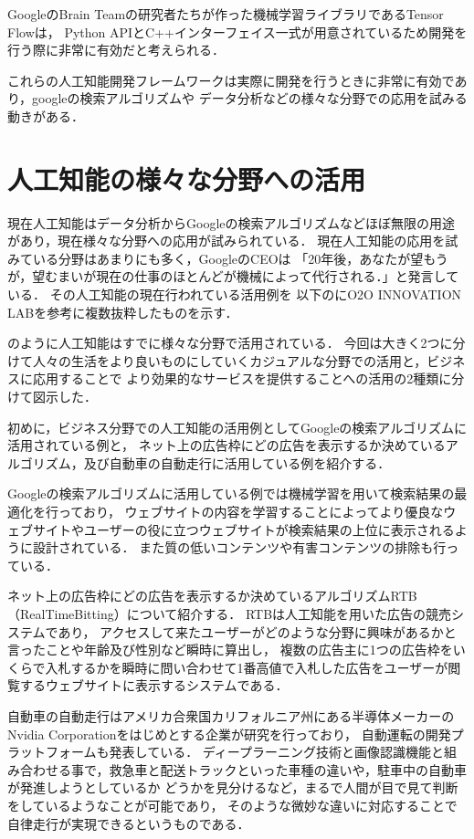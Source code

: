 GoogleのBrain Teamの研究者たちが作った機械学習ライブラリであるTensor Flowは，
Python APIとC++インターフェイス一式が用意されているため開発を行う際に非常に有効だと考えられる．

これらの人工知能開発フレームワークは実際に開発を行うときに非常に有効であり，googleの検索アルゴリズムや
データ分析などの様々な分野での応用を試みる動きがある．

\section{人工知能の様々な分野への活用}
現在人工知能はデータ分析からGoogleの検索アルゴリズムなどほぼ無限の用途があり，現在様々な分野への応用が試みられている．
現在人工知能の応用を試みている分野はあまりにも多く，GoogleのCEOは
「20年後，あなたが望もうが，望むまいが現在の仕事のほとんどが機械によって代行される．」\cite{ceo}と発言している．
その人工知能の現在行われている活用例を
以下のにO2O INNOVATION LAB\cite{lab}を参考に複数抜粋したものを示す．


のように人工知能はすでに様々な分野で活用されている．
今回は大きく2つに分けて人々の生活をより良いものにしていくカジュアルな分野での活用と，ビジネスに応用することで
より効果的なサービスを提供することへの活用の2種類に分けて図示した．

初めに，ビジネス分野での人工知能の活用例としてGoogleの検索アルゴリズムに活用されている例と，
ネット上の広告枠にどの広告を表示するか決めているアルゴリズム，及び自動車の自動走行に活用している例を紹介する．

Googleの検索アルゴリズムに活用している例では機械学習を用いて検索結果の最適化を行っており，
ウェブサイトの内容を学習することによってより優良なウェブサイトやユーザーの役に立つウェブサイトが検索結果の上位に表示されるように設計されている．
また質の低いコンテンツや有害コンテンツの排除も行っている．

ネット上の広告枠にどの広告を表示するか決めているアルゴリズムRTB（RealTimeBitting）について紹介する．
RTBは人工知能を用いた広告の競売システムであり，
アクセスして来たユーザーがどのような分野に興味があるかと言ったことや年齢及び性別など瞬時に算出し，
複数の広告主に1つの広告枠をいくらで入札するかを瞬時に問い合わせて1番高値で入札した広告をユーザーが閲覧するウェブサイトに表示するシステムである．

自動車の自動走行はアメリカ合衆国カリフォルニア州にある半導体メーカーのNvidia Corporationをはじめとする企業が研究を行っており，
自動運転の開発プラットフォームも発表している．
ディープラーニング技術と画像認識機能と組み合わせる事で，救急車と配送トラックといった車種の違いや，駐車中の自動車が発進しようとしているか
どうかを見分けるなど，まるで人間が目で見て判断をしているようなことが可能であり，
そのような微妙な違いに対応することで自律走行が実現できるというものである．

